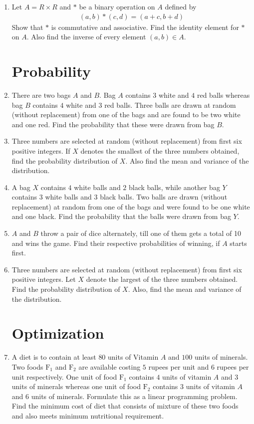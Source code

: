 \documentclass[12pt,-letter paper]{article}
\begin{document}
\begin{enumerate}
	\item Let $A = R \times R$ and $*$ be a binary operation on $A$ defined by
	\begin{align}
		(a, b) * (c, d) = (a + c, b + d)
	\end{align}
	Show that $*$ is commutative and associative. Find the identity element for $*$
on $A$. Also find the inverse of every element $(a, b) \in A$.
	
	

\section{Probability}
	\item There are two bags $A$ and $B$. Bag $A$ contains $3$ white and $4$ red balls whereas bag $B$ contains $4$ white and $3$ red balls. Three balls are drawn at random (without replacement) from one of the bags and are found to be two white and one red. Find the probability that these were drawn from bag $B$.

	\item Three numbers are selected at random (without replacement) from first six positive integers. If $X$ denotes the smallest of the three numbers obtained, find the probability distribution of $X$. Also find the mean and variance of the distribution.


	\item A bag $X$ contains $4$ white balls and $2$ black balls, while another bag $Y$ contains
$3$ white balls and $3$ black balls. Two balls are drawn (without replacement) at
random from one of the bags and were found to be one white and one black.
Find the probability that the balls were drawn from bag $Y$.

	\item $A$ and $B$ throw a pair of dice alternately, till one of them gets a total of 10 and
wins the game. Find their respective probabilities of winning, if $A$ starts first.

	\item Three numbers are selected at random (without replacement) from first six
positive integers. Let $X$ denote the largest of the three numbers obtained. Find
the probability distribution of $X$. Also, find the mean and variance of the
distribution.


\section{Optimization}
	\item A diet is to contain at least $80$ units of Vitamin $A$ and $100$ units of minerals. 
Two foods $\text{F}_1$ and $\text{F}_2$ are available costing $5$ rupees per unit and $6$ rupees per unit respectively. 
One unit of food $\text{F}_1$ contains $4$ units of vitamin $A$ and $3$ units of minerals whereas
 one unit of food $\text{F}_2$ contains $3$ units of vitamin $A$ and $6$ units of minerals. 
 Formulate this as a linear programming problem. Find the minimum cost of diet that consists of mixture of these two foods and also meets minimum nutritional requirement.
 

\end{enumerate}
\end{document}
